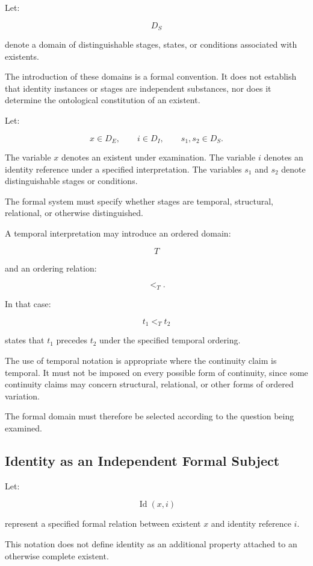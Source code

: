 Let:

\[
    D_S
\]

denote a domain of distinguishable stages, states,
or conditions associated with existents.

The introduction of these domains is a formal
convention. It does not establish that identity
instances or stages are independent substances,
nor does it determine the ontological constitution
of an existent.

Let:

\[
    x \in D_E,
    \qquad
    i \in D_I,
    \qquad
    s_1,s_2 \in D_S.
\]

The variable \(x\) denotes an existent under examination.
The variable \(i\) denotes an identity reference under
a specified interpretation. The variables \(s_1\) and
\(s_2\) denote distinguishable stages or conditions.

The formal system must specify whether stages are
temporal, structural, relational, or otherwise
distinguished.

A temporal interpretation may introduce an ordered
domain:

\[
    T
\]

and an ordering relation:

\[
    <_T.
\]

In that case:

\[
    t_1 <_T t_2
\]

states that \(t_1\) precedes \(t_2\) under the
specified temporal ordering.

The use of temporal notation is appropriate where
the continuity claim is temporal. It must not be
imposed on every possible form of continuity,
since some continuity claims may concern structural,
relational, or other forms of ordered variation.

The formal domain must therefore be selected
according to the question being examined.

\subsection{Identity as an Independent Formal Subject}

Let:

\[
    \operatorname{Id}(x,i)
\]

represent a specified formal relation between
existent \(x\) and identity reference \(i\).

This notation does not define identity as an
additional property attached to an otherwise
complete existent.

